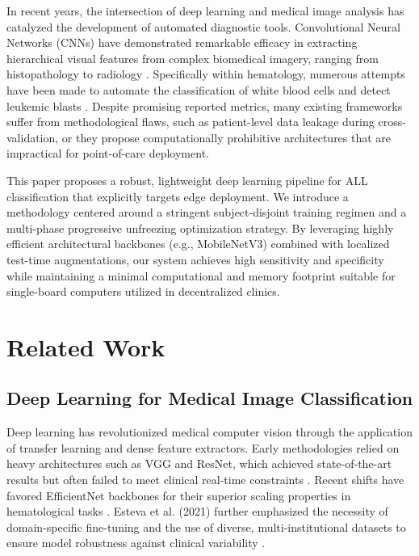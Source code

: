 \documentclass[journal]{IEEEtran}
\begin{document}
    In recent years, the intersection of deep learning and medical image analysis has catalyzed the development of automated diagnostic tools. Convolutional Neural Networks (CNNs) have demonstrated remarkable efficacy in extracting hierarchical visual features from complex biomedical imagery, ranging from histopathology to radiology \cite{b1, b2}. Specifically within hematology, numerous attempts have been made to automate the classification of white blood cells and detect leukemic blasts \cite{b3, b4, b6}. Despite promising reported metrics, many existing frameworks suffer from methodological flaws, such as patient-level data leakage during cross-validation, or they propose computationally prohibitive architectures that are impractical for point-of-care deployment.

    This paper proposes a robust, lightweight deep learning pipeline for ALL classification that explicitly targets edge deployment. We introduce a methodology centered around a stringent subject-disjoint training regimen and a multi-phase progressive unfreezing optimization strategy. By leveraging highly efficient architectural backbones (e.g., MobileNetV3) combined with localized test-time augmentations, our system achieves high sensitivity and specificity while maintaining a minimal computational and memory footprint suitable for single-board computers utilized in decentralized clinics.

    \section{Related Work}

    \subsection{Deep Learning for Medical Image Classification}
    Deep learning has revolutionized medical computer vision through the application of transfer learning and dense feature extractors. Early methodologies relied on heavy architectures such as VGG and ResNet, which achieved state-of-the-art results but often failed to meet clinical real-time constraints \cite{b2}. Recent shifts have favored EfficientNet backbones for their superior scaling properties in hematological tasks \cite{b12}. Esteva et al. (2021) further emphasized the necessity of domain-specific fine-tuning and the use of diverse, multi-institutional datasets to ensure model robustness against clinical variability \cite{b1}.
\end{document}
